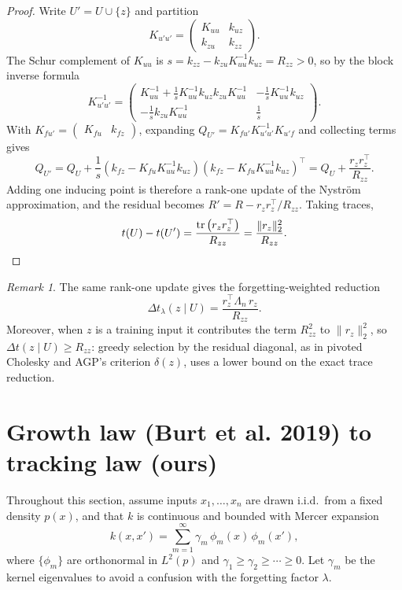 \documentclass[11pt,a4paper]{article}
\theoremstyle{definition}
\theoremstyle{remark}
\newtheorem{remark}{Remark}
\newcommand{\tr}{\mathrm{tr}}
\begin{document}
\begin{proof}
Write $U' = U \cup \{z\}$ and partition
\[
K_{u'u'} = \begin{pmatrix} K_{uu} & k_{uz} \\ k_{zu} & k_{zz} \end{pmatrix}.
\]
The Schur complement of $K_{uu}$ is $s = k_{zz} - k_{zu}K_{uu}^{-1}k_{uz} = R_{zz} > 0$, so by the block inverse formula
\[
K_{u'u'}^{-1} = \begin{pmatrix} K_{uu}^{-1} + \frac{1}{s}K_{uu}^{-1}k_{uz}k_{zu}K_{uu}^{-1} & -\frac{1}{s}K_{uu}^{-1}k_{uz} \\ -\frac{1}{s}k_{zu}K_{uu}^{-1} & \frac{1}{s} \end{pmatrix}.
\]
With $K_{fu'} = \begin{pmatrix} K_{fu} & k_{fz} \end{pmatrix}$, expanding $Q_{U'} = K_{fu'}K_{u'u'}^{-1}K_{u'f}$ and collecting terms gives
\[
Q_{U'} = Q_U + \frac{1}{s}\left(k_{fz} - K_{fu}K_{uu}^{-1}k_{uz}\right)\left(k_{fz} - K_{fu}K_{uu}^{-1}k_{uz}\right)^{\top} = Q_U + \frac{r_z r_z^{\top}}{R_{zz}}.
\]
Adding one inducing point is therefore a rank-one update of the Nyström approximation, and the residual becomes $R' = R - r_z r_z^{\top}/R_{zz}$. Taking traces,
\[
t(U) - t(U') = \frac{\tr\left(r_z r_z^{\top}\right)}{R_{zz}} = \frac{\|r_z\|_2^2}{R_{zz}}. \qedhere
\]
\end{proof}

\begin{remark}
The same rank-one update gives the forgetting-weighted reduction
\[
\Delta t_\lambda(z \mid U) = \frac{r_z^{\top}\Lambda_n\, r_z}{R_{zz}}.
\]
Moreover, when $z$ is a training input it contributes the term $R_{zz}^2$ to $\|r_z\|_2^2$, so $\Delta t(z \mid U) \geq R_{zz}$: greedy selection by the residual diagonal, as in pivoted Cholesky and AGP's criterion $\delta(z)$, uses a lower bound on the exact trace reduction.
\end{remark}

\section{Growth law (Burt et al. 2019) to tracking law (ours)}

Throughout this section, assume inputs $x_1, \ldots, x_n$ are drawn i.i.d.\ from a fixed density $p(x)$, and that $k$ is continuous and bounded with Mercer expansion
\[
k(x, x') = \sum_{m=1}^{\infty} \gamma_m\,\phi_m(x)\,\phi_m(x'),
\]
where $\{\phi_m\}$ are orthonormal in $L^2(p)$ and $\gamma_1 \geq \gamma_2 \geq \cdots \geq 0$. Let $\gamma_m$ be the kernel eigenvalues to avoid a confusion with the forgetting factor $\lambda$.
\end{document}
